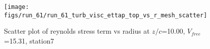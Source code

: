 \begin{figure}[H]
\centering
\texttt{[image: figs/run\_61/run\_61\_turb\_visc\_ettap\_top\_vs\_r\_mesh\_scatter]}
\caption{Scatter plot of reynolds stress term vs radius at $z/c$=10.00, $V_{free}$=15.31, station7}
\label{fig:run_61_turb_visc_ettap_top_vs_r_mesh_scatter}
\end{figure}


